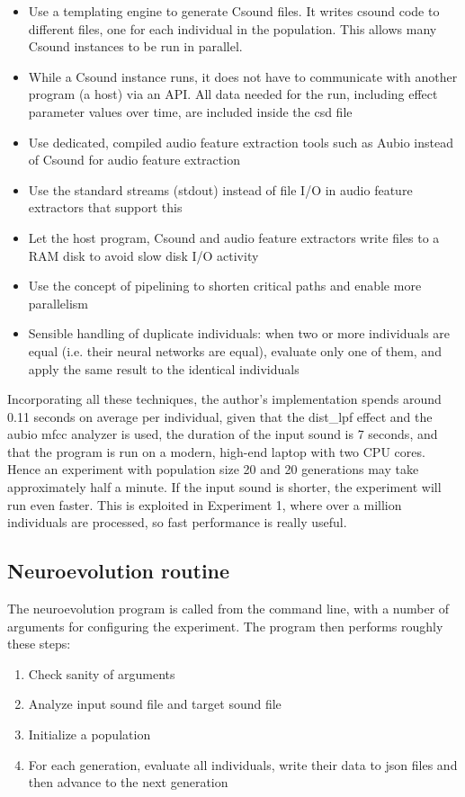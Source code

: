 \begin{itemize}  
\item Use a templating engine to generate Csound files. It writes csound code to different files, one for each individual in the population. This allows many Csound instances to be run in parallel.
\item While a Csound instance runs, it does not have to communicate with another program (a host) via an API. All data needed for the run, including effect parameter values over time, are included inside the csd file
\item Use dedicated, compiled audio feature extraction tools such as Aubio instead of Csound for audio feature extraction
\item Use the standard streams (stdout) instead of file I/O in audio feature extractors that support this
\item Let the host program, Csound and audio feature extractors write files to a RAM disk to avoid slow disk I/O activity
\item Use the concept of pipelining to shorten critical paths and enable more parallelism
\item Sensible handling of duplicate individuals: when two or more individuals are equal (i.e. their neural networks are equal), evaluate only one of them, and apply the same result to the identical individuals
\end{itemize}

Incorporating all these techniques, the author's implementation spends around 0.11 seconds on average per individual, given that the dist\_lpf effect and the aubio mfcc analyzer is used, the duration of the input sound is 7 seconds, and that the program is run on a modern, high-end laptop with two CPU cores. Hence an experiment with population size 20 and 20 generations may take approximately half a minute. If the input sound is shorter, the experiment will run even faster. This is exploited in Experiment 1, where over a million individuals are processed, so fast performance is really useful.

\subsection{Neuroevolution routine}
The neuroevolution program is called from the command line, with a number of arguments for configuring the experiment. The program then performs roughly these steps:

\begin{enumerate}  
\item Check sanity of arguments
\item Analyze input sound file and target sound file
\item Initialize a population
\item For each generation, evaluate all individuals, write their data to json files and then advance to the next generation
\end{enumerate}

